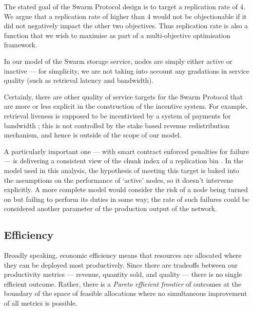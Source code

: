 The stated goal of the Swarm Protocol design is to target a replication rate of 4.
%
We argue that a replication rate of higher than 4 would not be objectionable if it did not negatively impact the other two objectives.
%
Thus replication rate is also a function that we wish to maximise as part of a multi-objective optimisation framework.

In our model of the Swarm storage service, nodes are simply either active or inactive --- for simplicity, we are not taking into account any gradations in service quality (such as retrieval latency and bandwidth).

\begin{remark} 
  \label{quality-metrics}

  Certainly, there are other quality of service targets for the Swarm Protocol that are more or less explicit in the construction of the incentive system.
  For example, retrieval liveness is supposed to be incentivised by a system of payments for bandwidth \cite[\S3.2]{book-of-swarm}; this is not controlled by the stake based revenue redistribution mechanism, and hence is outside of the scope of our model.
  
  A particularly important one --- with smart contract enforced penalties for failure --- is delivering a consistent view of the chunk index of a replication bin \cite[\S3.4.4]{book-of-swarm}.
  In the model used in this analysis, the hypothesis of meeting this target is baked into the assumptions on the performance of `active' nodes, so it doesn't intervene explicitly.
  A more complete model would consider the risk of a node being turned on but failing to perform its duties in some way; the rate of such failures could be considered another parameter of the production output of the network.

\end{remark}

\subsection{Efficiency}
\label{section:efficiency}

Broadly speaking, economic efficiency means that resources are allocated where they can be deployed most productively.
%
Since there are tradeoffs between our productivity metrics --- revenue, quantity sold, and quality --- there is no single efficient outcome.
%
Rather, there is a \emph{Pareto efficient frontier} of outcomes at the boundary of the space of feasible allocations where no simultaneous improvement of all metrics is possible.

